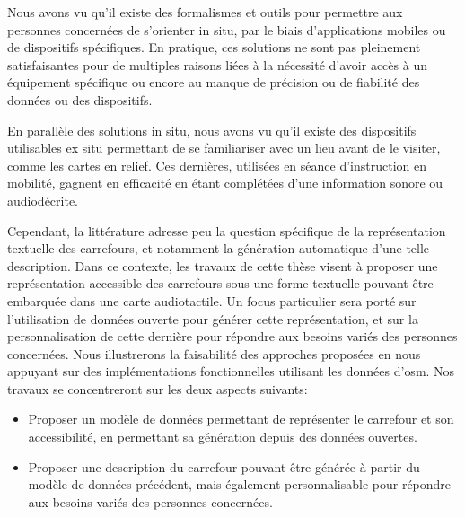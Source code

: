 \newpar{}

Nous avons vu qu'il existe des formalismes et outils pour permettre aux personnes concernées de s'orienter in situ, par le biais d'applications mobiles ou de dispositifs spécifiques. En pratique, ces solutions ne sont pas pleinement satisfaisantes pour de multiples raisons liées à la nécessité d'avoir accès à un équipement spécifique ou encore au manque de précision ou de fiabilité des données ou des dispositifs.

\newpar{}

En parallèle des solutions in situ, nous avons vu qu'il existe des dispositifs utilisables ex situ permettant de se familiariser avec un lieu avant de le visiter, comme les cartes en relief. Ces dernières, utilisées en séance d'instruction en mobilité, gagnent en efficacité en étant complétées d'une information sonore ou audiodécrite.

\newpar{}

Cependant, la littérature adresse peu la question spécifique de la représentation textuelle des carrefours, et notamment la génération automatique d'une telle description. Dans ce contexte, les travaux de cette thèse visent à proposer une représentation accessible des carrefours sous une forme textuelle pouvant être embarquée dans une carte audiotactile. Un focus particulier sera porté sur l'utilisation de données ouverte pour générer cette représentation, et sur la personnalisation de cette dernière pour répondre aux besoins variés des personnes concernées. Nous illustrerons la faisabilité des approches proposées en nous appuyant sur des implémentations fonctionnelles utilisant les données d'\gls{osm}. Nos travaux se concentreront sur les deux aspects suivants:

\begin{itemize}
    \item Proposer un modèle de données permettant de représenter le carrefour et son accessibilité, en permettant sa génération depuis des données ouvertes.
    \item Proposer une description du carrefour pouvant être générée à partir du modèle de données précédent, mais également personnalisable pour répondre aux besoins variés des personnes concernées.
\end{itemize}